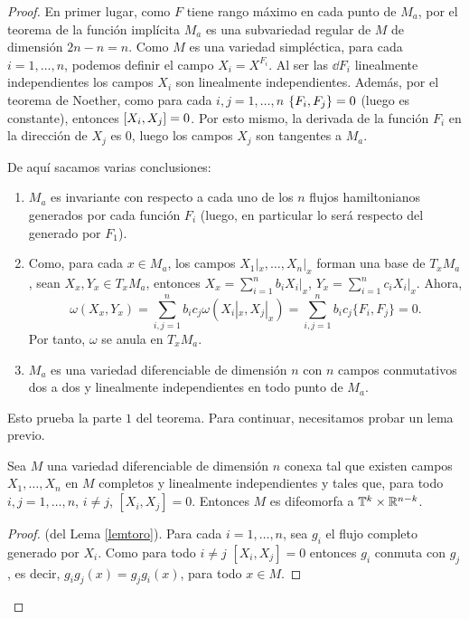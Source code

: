 \begin{proof}
  En primer lugar, como $F$ tiene rango máximo en cada punto de $M_a$, por el teorema de la función implícita $M_a$ es una subvariedad regular de $M$ de dimensión $2n-n=n$. 
  Como $M$ es una variedad simpléctica, para cada $i=1,\dots,n$, podemos definir el campo $X_i=X^{F_i}$. Al ser las $\dd F_i$ linealmente independientes los campos $X_i$ son linealmente independientes. Además, por el teorema de Noether, como para cada $i,j= 1,\dots,n$ $\left\lbrace F_i,F_j\right\rbrace=0$ (luego es constante), entonces $\left[X_i,X_j\right]=0$. Por esto mismo, la derivada de la función $F_i$ en la dirección de $X_j$ es 0, luego los campos $X_j$ son tangentes a $M_a$.

  De aquí sacamos varias conclusiones:
  \begin{enumerate}
    \item $M_a$ es invariante con respecto a cada uno de los $n$ flujos hamiltonianos generados por cada función $F_i$ (luego, en particular lo será respecto del generado por $F_1$).
    \item Como, para cada $x \in M_a$, los campos $X_1|_x,\dots, X_n|_x$ forman una base de $T_x M_a$, sean $X_x, Y_x \in T_x M_a$, entonces $X_x = \sum_{i=1}^n b_i X_i|_x$, $Y_x=\sum_{i=1}^n c_i X_i|_x$. Ahora,
      \[
	\omega(X_x,Y_x)= \sum_{i,j=1}^n b_i c_j \omega(X_i|_x,X_j|_x) = \sum_{i,j=1}^n b_i c_j \{F_i,F_j\} = 0.
      \]
      Por tanto, $\omega$ se anula en $T_x M_a$. 
    \item $M_a$ es una variedad diferenciable de dimensión $n$ con $n$ campos conmutativos dos a dos y linealmente independientes en todo punto de $M_a$. 
  \end{enumerate}

  Esto prueba la parte $1$ del teorema. Para continuar, necesitamos probar un lema previo.

  \begin{lema}\label{lemtoro}
    Sea $M$ una variedad diferenciable de dimensión $n$ conexa tal que existen campos $X_1,\dots,X_n$ en $M$ completos y linealmente independientes y tales que, para todo $i,j=1,\dots,n$, $i\neq j$, $[X_i,X_j]=0$. Entonces $M$ es difeomorfa a $\mathbb{T}^k\times \mathbb{R}^{n-k}$. 
\end{lema}
\begin{proof}(del Lema \ref{lemtoro}).
  Para cada $i=1,\dots,n$, sea $g_i$ el flujo completo generado por $X_i$. Como para todo $i\neq j$ $[X_i,X_j]=0 $ entonces $g_i$ conmuta con $g_j$, es decir, $g_ig_j (x)=g_jg_i (x)$, para todo $x \in M$. 


\end{proof}
\end{proof}
